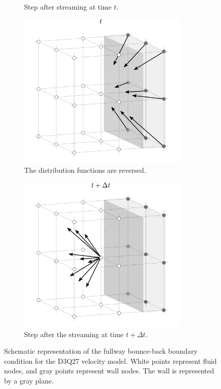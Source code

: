 \begin{figure}[h]
\begin{subfigure}{0.48\textwidth}
		\caption{Step after streaming at time $t$.}
		\label{fig:bbb}
	\end{subfigure}
	\par\bigskip
	\par\bigskip
	\begin{subfigure}{0.48\textwidth}
		\centering
		\includegraphics[width=0.9\textwidth, trim={0mm 0mm 0mm 0mm}]{figures/fwbbc.pdf}
		\caption{The distribution functions are reversed.}
		\label{fig:bbc}
	\end{subfigure}
	\begin{subfigure}{0.48\textwidth}
		\centering
		\includegraphics[width=0.9\textwidth, trim={0mm 0mm 0mm 0mm}]{figures/fwbbd.pdf}
		\caption{Step after the streaming at time $t + \Delta t$.}
		\label{fig:bbd}
	\end{subfigure}
	\vspace{5mm}
	\caption{Schematic representation of the fullway bounce-back boundary condition for the D3Q27 velocity model. White points represent fluid nodes, and gray points represent wall nodes. The wall is represented by a gray plane.}
	\label{fig:fbb}
\end{figure}

